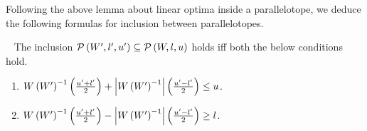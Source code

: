 Following the above lemma about linear optima inside a parallelotope, we
deduce the following formulas for inclusion between parallelotopes.
\begin{lemma}~\label{lem:ptope-ptope}
The inclusion $\mathcal{P}\left(W^\prime,l^\prime,u^\prime\right)\subseteq \mathcal{P}\left(W,l,u\right)$
holds iff both the below conditions hold.
\begin{enumerate}
\item $W\left(W^\prime\right)^{-1}\left(\frac{u^\prime+l^\prime}{2}\right) +
  \left|W\left(W^\prime\right)^{-1}\right|\left(\frac{u^\prime-l^\prime}{2}\right) \leq u$.
\item $W\left(W^\prime\right)^{-1}\left(\frac{u^\prime+l^\prime}{2}\right) -
  \left|W\left(W^\prime\right)^{-1}\right|\left(\frac{u^\prime-l^\prime}{2}\right) \geq l$.
\end{enumerate}
\end{lemma}



